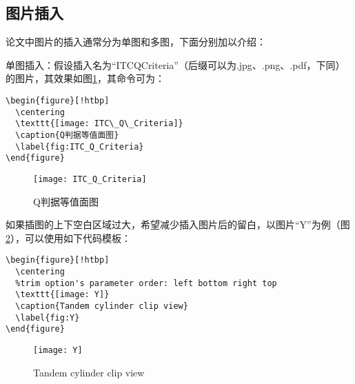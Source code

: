 \subsection{图片插入}

论文中图片的插入通常分为单图和多图，下面分别加以介绍：

单图插入：假设插入名为“ITC\textunderscore Q\textunderscore Criteria”（后缀可以为.jpg、.png、.pdf，下同）的图片，其效果如图\ref{fig:ITC_Q_Criteria}，其命令可为：
\begin{verbatim}
\begin{figure}[!htbp]
  \centering
  \texttt{[image: ITC\_Q\_Criteria]}
  \caption{Q判据等值面图}
  \label{fig:ITC_Q_Criteria}
\end{figure}
\end{verbatim}
\begin{figure}[!htbp]
  \centering
  \texttt{[image: ITC\_Q\_Criteria]}
  \caption{Q判据等值面图}
  \label{fig:ITC_Q_Criteria}
\end{figure}

如果插图的上下空白区域过大，希望减少插入图片后的留白，以图片“Y”为例（图\ref{fig:Y}），可以使用如下代码模板：
\begin{verbatim}
\begin{figure}[!htbp]
  \centering
  %trim option's parameter order: left bottom right top
  \texttt{[image: Y]}
  \caption{Tandem cylinder clip view}
  \label{fig:Y}
\end{figure}
\end{verbatim}
\begin{figure}[!htbp]
  \centering
  \texttt{[image: Y]}
  \caption{Tandem cylinder clip view}
  \label{fig:Y}
\end{figure}

